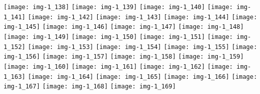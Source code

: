 \documentclass[a4paper]{article}
\begin{document}
	\texttt{[image: img-1\_138]}
	\texttt{[image: img-1\_139]}
	\texttt{[image: img-1\_140]}
	\texttt{[image: img-1\_141]}
	\texttt{[image: img-1\_142]}
	\texttt{[image: img-1\_143]}
	\texttt{[image: img-1\_144]}
	\texttt{[image: img-1\_145]}
	\texttt{[image: img-1\_146]}
	\texttt{[image: img-1\_147]}
	\texttt{[image: img-1\_148]}
	\texttt{[image: img-1\_149]}
	\texttt{[image: img-1\_150]}
	\texttt{[image: img-1\_151]}
	\texttt{[image: img-1\_152]}
	\texttt{[image: img-1\_153]}
	\texttt{[image: img-1\_154]}
	\texttt{[image: img-1\_155]}
	\texttt{[image: img-1\_156]}
	\texttt{[image: img-1\_157]}
	\texttt{[image: img-1\_158]}
	\texttt{[image: img-1\_159]}
	\texttt{[image: img-1\_160]}
	\texttt{[image: img-1\_161]}
	\texttt{[image: img-1\_162]}
	\texttt{[image: img-1\_163]}
	\texttt{[image: img-1\_164]}
	\texttt{[image: img-1\_165]}
	\texttt{[image: img-1\_166]}
	\texttt{[image: img-1\_167]}
	\texttt{[image: img-1\_168]}
	\texttt{[image: img-1\_169]}
\end{document}
